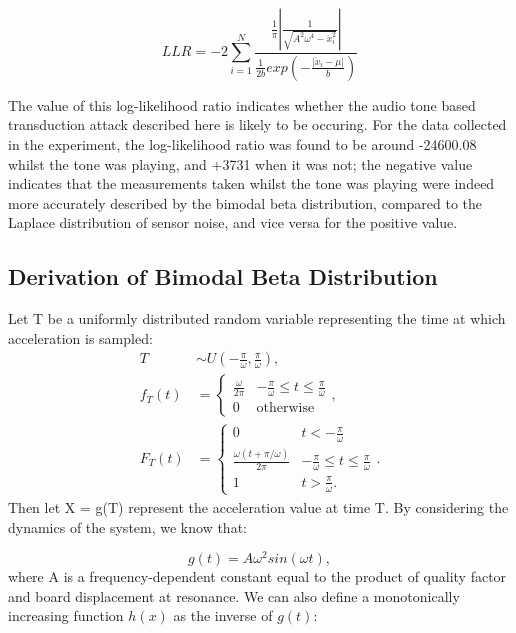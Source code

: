 \documentclass[12pt]{article}
\begin{document}
\begin{appendix}
    \begin{equation}
      LLR = -2 \sum_{i = 1}^{N} \frac{\frac{1}{\pi}\left| \frac{1}{\sqrt{A^2\omega^4 - \ddot{x}_i^2}} \right|}{\frac{1}{2b} exp\left(-\frac{|\ddot{x}_i-\mu|}{b}\right)}
    \end{equation}

    The value of this log-likelihood ratio indicates whether the audio tone based transduction attack described here is likely to be occuring. For the data collected in the experiment, the log-likelihood ratio was found to be around -24600.08 whilst the tone was playing, and +3731 when it was not; the negative value indicates that the measurements taken whilst the tone was playing were indeed more accurately described by the bimodal beta distribution, compared to the Laplace distribution of sensor noise, and vice versa for the positive value.

    \subsection{Derivation of Bimodal Beta Distribution} \label{Poster_Derivation}
    Let T be a uniformly distributed random variable representing the time at which acceleration is sampled:
    \begin{align}
      T & \sim U\left(-\frac{\pi}{\omega}, \frac{\pi}{\omega}\right), \nonumber \\
      f_T(t) & =
        \begin{cases}
          \frac{\omega}{2\pi} & -\frac{\pi}{\omega} \leq t \leq \frac{\pi}{\omega}\\
          0 & \text{otherwise}
        \end{cases},\\
      F_T(t) & =
        \begin{cases}
          0 & t < -\frac{\pi}{\omega}\\
          \frac{\omega (t + \pi / \omega)}{2\pi} & -\frac{\pi}{\omega} \leq t \leq \frac{\pi}{\omega}\\
          1 & t > \frac{\pi}{\omega}.
        \end{cases}.
    \end{align}
    Then let X = g(T) represent the acceleration value at time T. By considering the dynamics of the system, we know that:

    \begin{equation}
      g(t) = A \omega^2 sin(\omega t),
    \end{equation}
    where A is a frequency-dependent constant equal to the product of quality factor and board displacement at resonance. We can also define a monotonically increasing function $h(x)$ as the inverse of $g(t)$:


\end{appendix}
\end{document}
